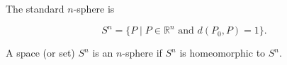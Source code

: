 The standard $n$-sphere is

$$S^n = \{ P \mid P \in \mathbb{R}^n \text{ and } d(P_0, P) = 1 \}.$$

A space (or set) $S^n$ is an $n$-sphere if $S^n$ is homeomorphic to $S^n$.

